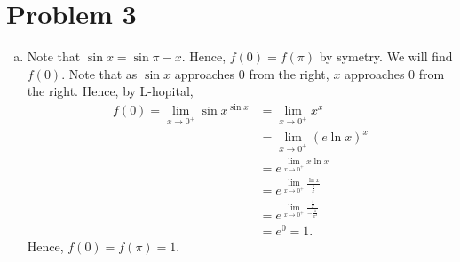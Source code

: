 \documentclass[12pt,a4paper]{article}
\begin{document}
    \section*{Problem 3}
    \begin{enumerate}[a.]
    
    \item Note that $\sin{x} = \sin{\pi-x}$. Hence, $f(0) = f(\pi)$ by symetry. We will find $f(0)$. Note that as $\sin{x}$ approaches 0 from the right, $x$ approaches 0 from the right. Hence, by L-hopital, 
    \begin{align*}
    f(0) = \lim_{x \rightarrow 0^+} \sin{x}^{\sin{x}} &= \lim_{x \rightarrow 0^+} x^x \\
    &= \displaystyle{\lim_{x \rightarrow 0^+}} (e \ln{x})^x \\
    &= e^{\displaystyle{\lim_{x \rightarrow 0^+} x \ln{x}}} \\
    &= e^{\displaystyle{\lim_{x \rightarrow 0^+} \frac{\ln{x}}{\frac{1}{x}}}} \\
    &= e^{\displaystyle{\lim_{x \rightarrow 0^+} \frac{\frac{1}{x}}{-\frac{1}{x^2}}}} \\
    &= e^0 = 1.
    \end{align*}
    Hence, $f(0)= f(\pi) = 1$.
    

\end{enumerate}
\end{document}
